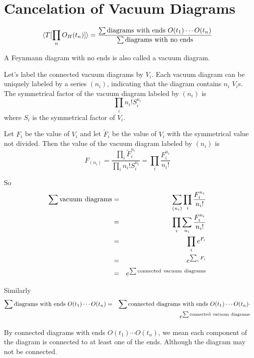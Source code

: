 \documentclass[12pt]{book}
\begin{document}
	\section{Cancelation of Vacuum Diagrams}
	\begin{equation}
		\langle T[\prod_nO_H(t_n)]\rangle=\frac{\sum{\rm diagrams\ with\ ends\ }O(t_1)\cdots O(t_n)}{\sum{\rm diagrams\ with\ no\ ends}}
	\end{equation}
	
	A Feynmann diagram with no ends is also called a vacuum diagram.
	
	Let's label the connected vacuum diagrams by $V_i$. Each vacuum diagram can be uniquely labeled by a series $(n_i)$, indicating that the diagram contains $n_i$ $V_i$s. The symmetrical factor of the vacuum diagram labeled by $(n_i)$ is
	\begin{equation}
		\prod_i n_i!S_i^{n_i}
	\end{equation}
	where $S_i$ is the symmetrical factor of $V_i$.
	
	Let $F_i$ be the value of $V_i$ and let $\tilde F_i$ be the value of $V_i$ with the symmetrical value not divided. Then the value of the vacuum diagram labeled by $(n_i)$ is
	\begin{equation}
		F_{(n_i)}=\frac{\prod_i \tilde F_i^{n_i}}{\prod_i n_i!S_i^{n_i}}=\prod_i \frac{ F_i^{n_i}}{n_i!}
	\end{equation}
	
	So
	\begin{eqnarray}
		\sum{\rm vacuum\ diagrams}&=&\sum_{(n_i)}\prod_i\frac{ F_i^{n_i}}{n_i!}\\
		&=&\prod_i\sum_{n_i} \frac{ F_i^{n_i}}{n_i!}\\
		&=&\prod_ie^{ F_i}\\
		&=&e^{\sum_i F_i}\\
		&=&e^{\sum{\rm connected\ vacuum\ diagrams}}
	\end{eqnarray}
	
	Similarly
	\begin{eqnarray}
		\sum{\rm diagrams\ with\ ends\ }O(t_1)\cdots O(t_n)&=&\sum{\rm connected\  diagrams\ with\ ends\ }O(t_1)\cdots O(t_n)\cdot\nonumber\\
		&&e^{\sum{\rm connected\ vacuum\ diagrams}}
	\end{eqnarray}
	
	By connected diagrams with ends $O(t_1)\cdots O(t_n)$, we mean each component of the diagram is connected to at least one of the ends. Although the diagram may not be connected.
	
\end{document}
